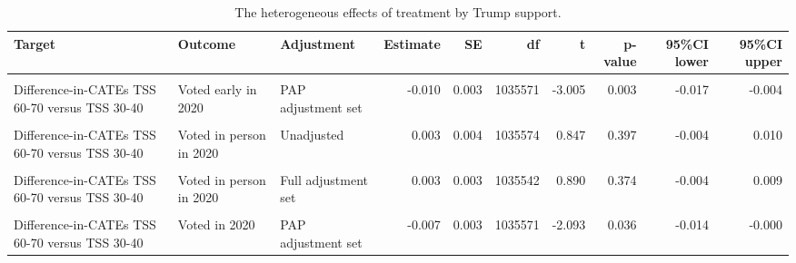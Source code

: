 \begin{table}
\centering
\caption{The heterogeneous effects of treatment by Trump support.}
\centering
\fontsize{8}{10}\selectfont
\begin{tabular}[t]{lllrrrrrrr}
\toprule
Target & Outcome & Adjustment & Estimate & SE & df & t & p-value & 95\%CI lower & 95\%CI upper\\
\midrule
\cellcolor{gray!10}{Difference-in-CATEs TSS 60-70 versus TSS 30-40} & \cellcolor{gray!10}{Voted early in 2020} & \cellcolor{gray!10}{Unadjusted} & \cellcolor{gray!10}{-0.010} & \cellcolor{gray!10}{0.003} & \cellcolor{gray!10}{1035574} & \cellcolor{gray!10}{-3.002} & \cellcolor{gray!10}{0.003} & \cellcolor{gray!10}{-0.017} & \cellcolor{gray!10}{-0.004}\\
Difference-in-CATEs TSS 60-70 versus TSS 30-40 & Voted early in 2020 & PAP adjustment set & -0.010 & 0.003 & 1035571 & -3.005 & 0.003 & -0.017 & -0.004\\
\cellcolor{gray!10}{Difference-in-CATEs TSS 60-70 versus TSS 30-40} & \cellcolor{gray!10}{Voted early in 2020} & \cellcolor{gray!10}{Full adjustment set} & \cellcolor{gray!10}{-0.011} & \cellcolor{gray!10}{0.003} & \cellcolor{gray!10}{1035542} & \cellcolor{gray!10}{-3.151} & \cellcolor{gray!10}{0.002} & \cellcolor{gray!10}{-0.017} & \cellcolor{gray!10}{-0.004}\\
Difference-in-CATEs TSS 60-70 versus TSS 30-40 & Voted in person in 2020 & Unadjusted & 0.003 & 0.004 & 1035574 & 0.847 & 0.397 & -0.004 & 0.010\\
\cellcolor{gray!10}{Difference-in-CATEs TSS 60-70 versus TSS 30-40} & \cellcolor{gray!10}{Voted in person in 2020} & \cellcolor{gray!10}{PAP adjustment set} & \cellcolor{gray!10}{0.003} & \cellcolor{gray!10}{0.003} & \cellcolor{gray!10}{1035571} & \cellcolor{gray!10}{0.922} & \cellcolor{gray!10}{0.356} & \cellcolor{gray!10}{-0.003} & \cellcolor{gray!10}{0.010}\\
Difference-in-CATEs TSS 60-70 versus TSS 30-40 & Voted in person in 2020 & Full adjustment set & 0.003 & 0.003 & 1035542 & 0.890 & 0.374 & -0.004 & 0.009\\
\cellcolor{gray!10}{Difference-in-CATEs TSS 60-70 versus TSS 30-40} & \cellcolor{gray!10}{Voted in 2020} & \cellcolor{gray!10}{Unadjusted} & \cellcolor{gray!10}{-0.007} & \cellcolor{gray!10}{0.004} & \cellcolor{gray!10}{1035574} & \cellcolor{gray!10}{-1.933} & \cellcolor{gray!10}{0.053} & \cellcolor{gray!10}{-0.015} & \cellcolor{gray!10}{0.000}\\
Difference-in-CATEs TSS 60-70 versus TSS 30-40 & Voted in 2020 & PAP adjustment set & -0.007 & 0.003 & 1035571 & -2.093 & 0.036 & -0.014 & -0.000\\

\end{tabular}
\end{table}
